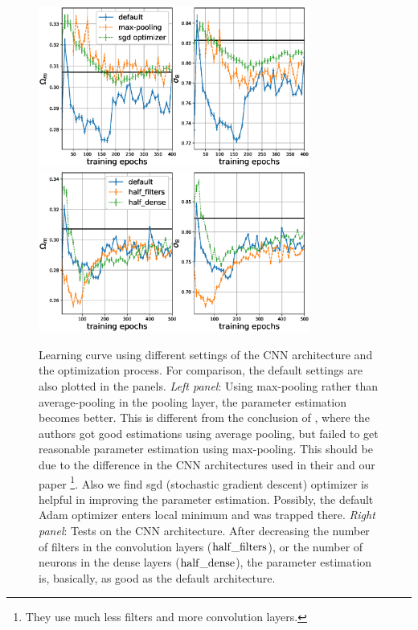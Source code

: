 \documentclass[twocolumn]{aastex61}
\begin{document}
\begin{figure}
   \centering
    \includegraphics[height=5.3cm]{lc_sgdmaxpool.eps}
    \includegraphics[height=5.3cm]{lc_half.eps}
   \caption{\label{lc_default}
   Learning curve using different settings of the CNN architecture and the optimization process.
   For comparison, the default settings are also plotted in the panels.
   {\it Left panel}: Using max-pooling rather than average-pooling in the pooling layer,
    the parameter estimation becomes better.
   This is different from the conclusion of \citep{Ravanbakhsh2017}, 
   where the authors got good estimations using average pooling, but failed to get reasonable parameter estimation using max-pooling.
   This should be due to the difference in the CNN architectures used in their and our paper
   \footnote{They use much less filters and more convolution layers.}.
   Also we find sgd (stochastic gradient descent) optimizer is helpful in improving the parameter estimation.
   Possibly, the default Adam optimizer enters local minimum and was trapped there.
   {\it Right panel}: Tests on the CNN architecture. 
   After decreasing the number of filters in the convolution layers (${\rm half\_filters}$),
   or the number of neurons in the dense layers (${\rm half\_dense}$), 
   the parameter estimation is, basically, as good as the default architecture.
   }
\end{figure}
\end{document}
